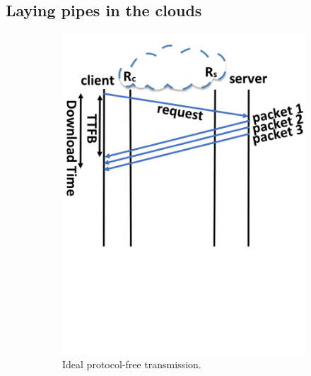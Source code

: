 \subsection{Laying pipes in the clouds}\label{sec:rate-control}

\begin{figure}[!t]
  \centering
    \begin{subfigure}{0.65\columnwidth}
  \centering
  \includegraphics[width=\columnwidth]{figures/ideal.png}
    \caption{Ideal protocol-free transmission.}
    \label{fig:ideal}
\end{subfigure}    \centering
\begin{subfigure}{0.65\columnwidth}
  \centering

\end{subfigure}
\end{figure}

